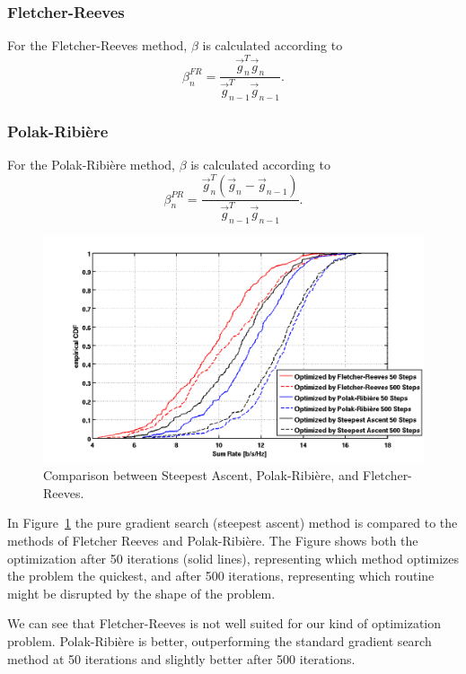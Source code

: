 \subsubsection{Fletcher-Reeves}
For the Fletcher-Reeves method, $\beta$ is calculated according to~\cite{Fletcher64}
\begin{equation}
\beta_n^{FR} = \frac{\vec{g}_n^T \vec{g}_n}{\vec{g}_{n-1}^T \vec{g}_{n-1}}.
\label{eq:beta_fr}
\end{equation}

\subsubsection{Polak-Ribi\`{e}re}
For the Polak-Ribi\`{e}re method, $\beta$ is calculated according to~\cite{Polak69}
\begin{equation}
\beta_n^{PR} = \frac{\vec{g}_n^T\left(\vec{g}_n-\vec{g}_{n-1}\right)}{\vec{g}_{n-1}^T \vec{g}_{n-1}}.
\label{eq:beta_fr}
\end{equation}

\begin{figure}[h]
\centering
  \includegraphics[width=0.8\linewidth]{images/Conjgradcomparison_edited.png}
\caption{Comparison between Steepest Ascent, Polak-Ribi\`{e}re, and Fletcher-Reeves.}
\label{fig:pr_fr_sa}
\end{figure}

In Figure~\ref{fig:pr_fr_sa} the pure gradient search (steepest ascent) method is compared to the methods of Fletcher Reeves and Polak-Ribi\`{e}re.
The Figure shows both the optimization after 50 iterations (solid lines), representing which method optimizes the problem the quickest, and after 500 iterations, representing which routine might be disrupted by the shape of the problem.


We can see that Fletcher-Reeves is not well suited for our kind of optimization problem.
Polak-Ribi\`{e}re is better, outperforming the standard gradient search method at 50 iterations and slightly better after 500 iterations.


